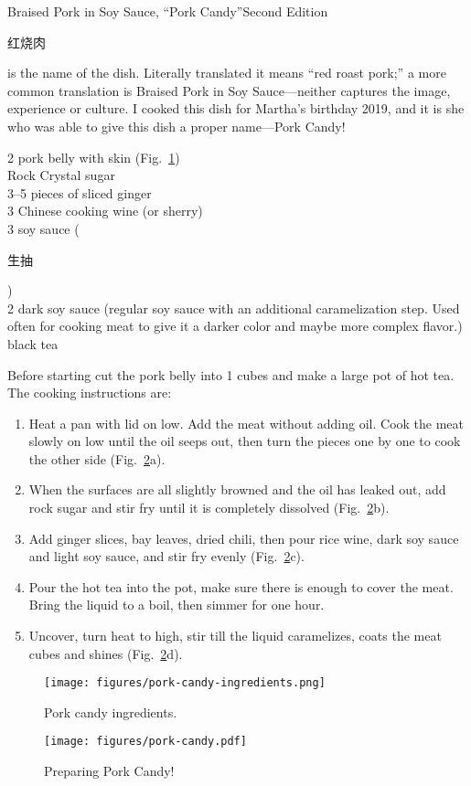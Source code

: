\begin{entry}{Braised Pork in Soy Sauce, ``Pork Candy''}{Second Edition}
\begin{open}
  \begin{CJK*}{UTF8}{gbsn}红烧肉\end{CJK*} is the name of the dish. Literally translated it means ``red roast pork;'' a more common translation is Braised Pork in Soy Sauce---neither captures the image, experience or culture. I cooked this dish for Martha's birthday 2019, and it is she who was able to give this dish a proper name---Pork Candy!
\end{open}
\begin{ingredients}
  \SI{2}{\pound} pork belly with skin (Fig.~\ref{fig:pork-candy-ingredients})\\
  Rock Crystal sugar\\
  \numrange{3}{5} pieces of sliced ginger\\
  \SI{3}{\tblspoon} Chinese cooking wine (or sherry)\\
  \SI{3}{\tblspoon} soy sauce (\begin{CJK*}{UTF8}{gbsn}生抽\end{CJK*})\\
  \SI{2}{\tblspoon} dark soy sauce (regular soy sauce with an additional
  caramelization step. Used often for cooking meat to give it a darker color and
  maybe more complex flavor.)\\
  black tea
\end{ingredients}
Before starting cut the pork belly into \SI{1}{\inch} cubes and make a large pot
of hot tea.  The cooking instructions are:
\begin{enumerate}
    \item  Heat a pan with lid on low. Add the meat without adding oil. Cook the
    meat slowly on low until the oil seeps out, then turn the pieces one by one
    to cook the other side (Fig.~\ref{fig:pork-candy-prep}a).
    \item When the surfaces are all slightly browned and the oil has leaked out,
    add rock sugar and stir fry until it is completely dissolved
    (Fig.~\ref{fig:pork-candy-prep}b).
    \item Add ginger slices, bay leaves, dried chili, then pour rice wine, dark
    soy sauce and light soy sauce, and stir fry evenly
    (Fig.~\ref{fig:pork-candy-prep}c).
    \item Pour the hot tea into the pot, make sure there is enough to cover the
    meat. Bring the liquid to a boil, then simmer for one hour.
    \item Uncover, turn heat to high, stir till the liquid caramelizes, coats
    the meat cubes and shines (Fig.~\ref{fig:pork-candy-prep}d).
\end{enumerate}
\begin{figure}[h]
  \centering
  \texttt{[image: figures/pork-candy-ingredients.png]}
  \caption{Pork candy ingredients.}
  \label{fig:pork-candy-ingredients}
\end{figure}
\begin{figure}
  \centering
  \texttt{[image: figures/pork-candy.pdf]}
  \caption{Preparing Pork Candy!}
  \label{fig:pork-candy-prep}
\end{figure}


\end{entry}

